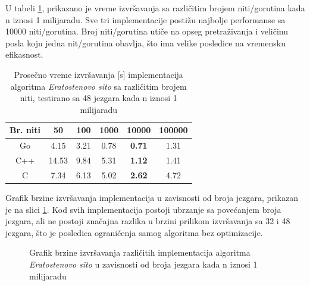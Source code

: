\documentclass[12pt,oneside]{memoir}
\begin{document}
U tabeli \ref{tab:prime5}, prikazano je vreme izvršavanja sa različitim brojem niti/gorutina kada n iznosi 1 milijaradu. Sve tri implementacije postižu najbolje performanse sa 10000 niti/gorutina. Broj niti/gorutina utiče na opseg pretraživanja i veličinu posla koju jedna nit/gorutina obavlja, što ima velike posledice na vremensku efikasnost.

\begin{table}
\begin{center}
\caption{Prosečno vreme izvršavanja [s] implementacija algoritma \textit{Eratostenovo sito} sa različitim brojem niti, testirano sa 48 jezgara kada n iznosi 1 milijaradu}
\begin{tabular}{||c||c c c c c||}
\hline
Br. niti		&50 &100 &1000 &10000&100000\\ \hline
Go	&4.15	&3.21	&0.78&\textbf{0.71}&1.31\\ \hline
C++  &14.53&9.84	&5.31&\textbf{1.12}&1.41\\ \hline
C	&7.34	&6.13	&5.02&\textbf{2.62}&4.72\\ \hline
\end{tabular}
\label{tab:prime5}
\end{center}
\end{table}

Grafik brzine izvršavanja implementacija u zavisnosti od broja jezgara, prikazan je na slici \ref{fig:prime3}. Kod svih implementacija postoji ubrzanje sa povećanjem broja jezgara, ali ne postoji značajna razlika u brzini prilikom izvršavanja sa 32  i 48 jezgara, što je posledica ograničenja samog algoritma bez optimizacije.

\begin{figure}
\begin{center}


\caption{Grafik brzine izvršavanja različitih implementacija algoritma \textit{Eratostenovo sito} u zavisnosti od broja jezgara  kada n iznosi 1 milijaradu}
\label{fig:prime3}
\end{center}
\end{figure}
\end{document}
